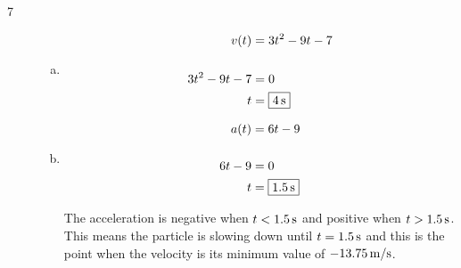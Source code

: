 \documentclass[letterpaper, landscape]{exam}
\begin{document}
  \begin{description}







    \item[7]
      \begin{enumerate}[(a)]
        \item 
          \begin{align*}
            v(t)          & = 3t^2 - 9t - 7 \\
            \\
            3t^2 - 9t - 7 & = 0 \\
            t             & = \boxed{ \unit[4]{s} } \\
          \end{align*}

        \item
          \begin{align*}
            a(t)   & = 6t - 9 \\
            \\
            6t - 9 & = 0 \\
            t      & = \boxed{ \unit[1.5]{s} } \\
          \end{align*}

          The acceleration is negative when $t < \unit[1.5]{s}$ and positive when $t >
          \unit[1.5]{s}$. This means the particle is slowing down until $t = \unit[1.5]{s}$ and this
          is the point when the velocity is its minimum value of $\unit[-13.75]{m/s}$.


\end{enumerate}
\end{description}
\end{document}

